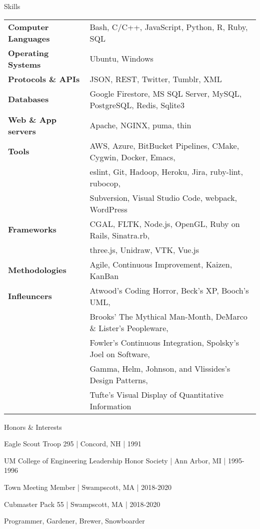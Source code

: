 \documentclass{resume}
\begin{document}
\begin{rSection}{Skills}
\begin{tabular}{ @{} >{\bfseries}l @{\hspace{6ex}} l }
Computer Languages & Bash, C/C++, JavaScript, Python, R, Ruby, SQL \\
Operating Systems & Ubuntu, Windows \\
Protocols \& APIs & JSON, REST, Twitter, Tumblr, XML \\
Databases & Google Firestore, MS SQL Server, MySQL, PostgreSQL, Redis, Sqlite3 \\
Web \& App servers & Apache, NGINX, puma, thin \\
Tools & AWS, Azure, BitBucket Pipelines, CMake, Cygwin, Docker, Emacs, \\
 & eslint, Git, Hadoop, Heroku, Jira, ruby-lint, rubocop, \\
 & Subversion, Visual Studio Code, webpack, WordPress \\
Frameworks & CGAL, FLTK, Node.js, OpenGL, Ruby on Rails, Sinatra.rb, \\
 & three.js, Unidraw, VTK, Vue.js \\
Methodologies & Agile, Continuous Improvement, Kaizen, KanBan \\
Infleuncers & Atwood's Coding Horror, Beck's XP, Booch's UML, \\
 & Brooks' The Mythical Man-Month, DeMarco \& Lister's Peopleware, \\
 & Fowler's Continuous Integration, Spolsky's Joel on Software, \\
 & Gamma, Helm, Johnson, and Vlissides's Design Patterns, \\
 & Tufte's Visual Display of Quantitative Information
\end{tabular}
\end{rSection}

\begin{rSection}{Honors \& Interests}
\item Eagle Scout Troop 295 | Concord, NH | 1991
\item UM College of Engineering Leadership Honor Society | Ann Arbor, MI | 1995-1996
\item Town Meeting Member | Swampscott, MA | 2018-2020
\item Cubmaster Pack 55 | Swampscott, MA | 2018-2020
\item Programmer, Gardener, Brewer, Snowboarder
\end{rSection}
\end{document}
